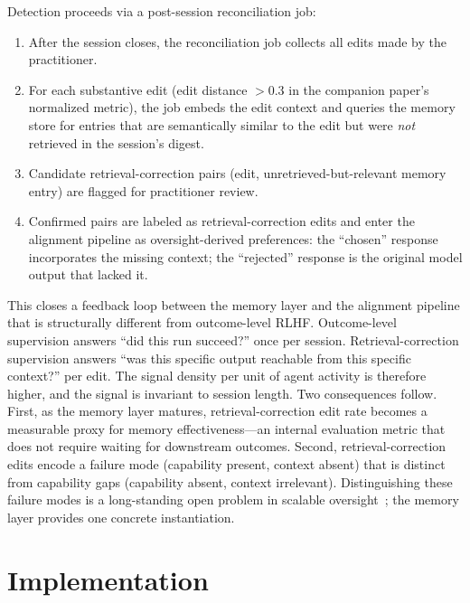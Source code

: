 \documentclass[11pt]{article}
\begin{document}
Detection proceeds via a post-session reconciliation job:

\begin{enumerate}[leftmargin=*, nosep]
  \item After the session closes, the reconciliation job collects all edits made by the practitioner.
  \item For each substantive edit (edit distance $> 0.3$ in the companion paper's normalized metric), the job embeds the edit context and queries the memory store for entries that are semantically similar to the edit but were \emph{not} retrieved in the session's digest.
  \item Candidate retrieval-correction pairs (edit, unretrieved-but-relevant memory entry) are flagged for practitioner review.
  \item Confirmed pairs are labeled as retrieval-correction edits and enter the alignment pipeline as oversight-derived preferences: the ``chosen'' response incorporates the missing context; the ``rejected'' response is the original model output that lacked it.
\end{enumerate}

This closes a feedback loop between the memory layer and the alignment pipeline that is structurally different from outcome-level RLHF.
Outcome-level supervision answers ``did this run succeed?'' once per session.
Retrieval-correction supervision answers ``was this specific output reachable from this specific context?'' per edit.
The signal density per unit of agent activity is therefore higher, and the signal is invariant to session length.
Two consequences follow.
First, as the memory layer matures, retrieval-correction edit rate becomes a measurable proxy for memory effectiveness---an internal evaluation metric that does not require waiting for downstream outcomes.
Second, retrieval-correction edits encode a failure mode (capability present, context absent) that is distinct from capability gaps (capability absent, context irrelevant).
Distinguishing these failure modes is a long-standing open problem in scalable oversight~\citep{bowman2022scalable}; the memory layer provides one concrete instantiation.


\section{Implementation}
\label{sec:implementation}
\end{document}
